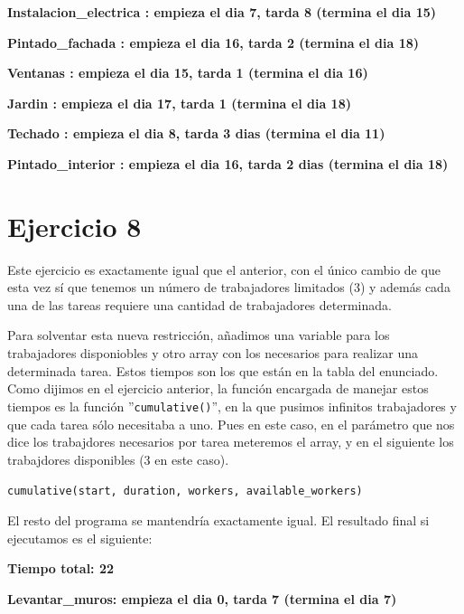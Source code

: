 \documentclass[11pt,a4paper]{article}
\begin{document}
\textbf{Instalacion\_electrica : empieza el dia 7, tarda 8 (termina el dia 15)} \vspace{-8px}

\textbf{Pintado\_fachada : empieza el dia 16, tarda 2 (termina el dia 18)} \vspace{-8px}

\textbf{Ventanas : empieza el dia 15, tarda 1 (termina el dia 16)} \vspace{-8px}

\textbf{Jardin : empieza el dia 17, tarda 1 (termina el dia 18)} \vspace{-8px}

\textbf{Techado : empieza el dia 8, tarda 3 dias (termina el dia 11)} \vspace{-8px}

\textbf{Pintado\_interior : empieza el dia 16, tarda 2 dias (termina el dia 18)} \vspace{-8px}



\section*{Ejercicio 8}
Este ejercicio es exactamente igual que el anterior, con el único cambio de que esta vez sí que tenemos un número de trabajadores limitados (3) y
además cada una de las tareas requiere una cantidad de trabajadores determinada.

Para solventar esta nueva restricción, añadimos una variable para los trabajadores disponiobles y otro array con los necesarios para realizar
una determinada tarea. Estos tiempos son los que están en la tabla del enunciado. Como dijimos en el ejercicio anterior, la función encargada
de manejar estos tiempos es la función ''\texttt{cumulative()}'', en la que pusimos infinitos trabajadores y que cada tarea sólo necesitaba
a uno. Pues en este caso, en el parámetro que nos dice los trabajdores necesarios por tarea meteremos el array, y en el siguiente los trabajdores
disponibles (3 en este caso).

\texttt{cumulative(start, duration, workers, available\_workers)}

El resto del programa se mantendría exactamente igual. El resultado final si ejecutamos es el siguiente:

\textbf{Tiempo total: 22} \vspace{-8px}

\textbf{Levantar\_muros: empieza el dia 0, tarda 7 (termina el dia 7)} \vspace{-8px}
\end{document}
